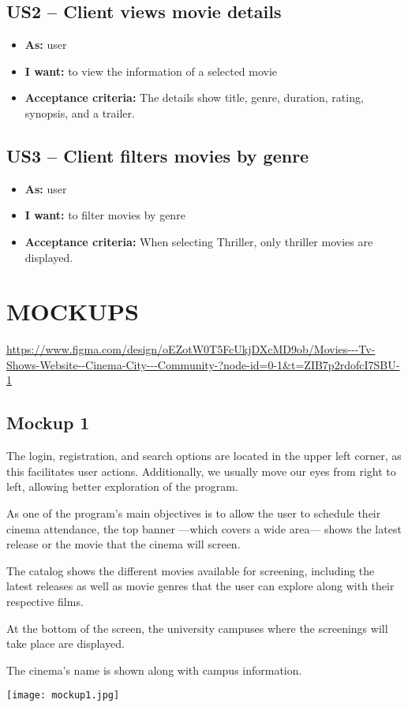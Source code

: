\documentclass[12pt, letterpaper]{article}
\begin{document}
\subsection*{US2 – Client views movie details}
\begin{itemize}
    \item \textbf{As:} user
    \item \textbf{I want:} to view the information of a selected movie
    \item \textbf{Acceptance criteria:} The details show title, genre, duration, rating, synopsis, and a trailer.
\end{itemize}

\subsection*{US3 – Client filters movies by genre}
\begin{itemize}
    \item \textbf{As:} user
    \item \textbf{I want:} to filter movies by genre
    \item \textbf{Acceptance criteria:} When selecting Thriller, only thriller movies are displayed.
\end{itemize}

\section{MOCKUPS}

\url{https://www.figma.com/design/oEZotW0T5FcUkjDXcMD9ob/Movies---Tv-Shows-Website--Cinema-City---Community-?node-id=0-1&t=ZIB7p2rdofcI7SBU-1}

\newpage
\begin{samepage}
\subsection*{Mockup 1}
The login, registration, and search options are located in the upper left corner, as this facilitates user actions. Additionally, we usually move our eyes from right to left, allowing better exploration of the program.

As one of the program’s main objectives is to allow the user to schedule their cinema attendance, the top banner —which covers a wide area— shows the latest release or the movie that the cinema will screen.

The catalog shows the different movies available for screening, including the latest releases as well as movie genres that the user can explore along with their respective films.

At the bottom of the screen, the university campuses where the screenings will take place are displayed.

The cinema’s name is shown along with campus information.

\begin{center}
    \texttt{[image: mockup1.jpg]}
\end{center}
\end{samepage}
\end{document}
